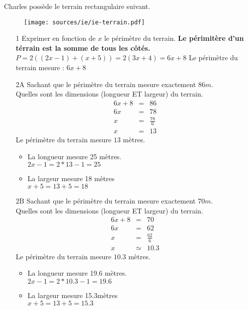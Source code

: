 \documentclass[11pt]{article}
\begin{document}
\begin{multicols}{2}

  Charles possède le terrain rectangulaire suivant. 

  \begin{figure}[H]
    \centering
    \texttt{[image: sources/ie/ie-terrain.pdf]}
  \end{figure}
 
  \begin{enumerate}
  \item[1] Exprimer en fonction de $x$ le périmètre du terrain.
  \textbf{Le périmitère d'un térrain est la somme de tous les côtés.} \\
  $P = 2 \left( (2x-1) + (x+5) \right) = 2 ( 3x + 4) = 6x + 8$
  Le périmètre du terrain mesure : $6x+8$
  \item[2A] Sachant que le périmètre du terrain mesure exactement $86m$.\\
  Quelles sont les dimensions (longueur ET largeur) du terrain.
     \begin{eqnarray*}
	6x + 8 &=& 86\\
	6x &=& 78\\
	x &=& \frac{78}{6}\\
	x &=& 13
  \end{eqnarray*}
  Le périmètre du terrain mesure $13$ mètres.\\
  \begin{itemize}
  \item La longueur mesure 25 mètres.\\
  $2x-1 = 2*13 -1 = 25$
   \item La largeur mesure 18 mètres\\
   $x+5 = 13 + 5 = 18$
   \end{itemize}
   
   \item[2B] Sachant que le périmètre du terrain mesure exactement $70m$.\\
  Quelles sont les dimensions (longueur ET largeur) du terrain.
     \begin{eqnarray*}
	6x + 8 &=& 70\\
	6x &=& 62\\
	x &=& \frac{62}{6}\\
	x &\simeq& 10.3
  \end{eqnarray*}
  Le périmètre du terrain mesure $10.3$ mètres.\\
  \begin{itemize}
  \item La longueur mesure 19.6 mètres.\\
  $2x-1 = 2*10.3 -1 = 19.6$
   \item La largeur mesure 15.3mètres\\
   $x+5 = 13 + 5 = 15.3$
   \end{itemize}  
  \end{enumerate}

\end{multicols}
\end{document}
